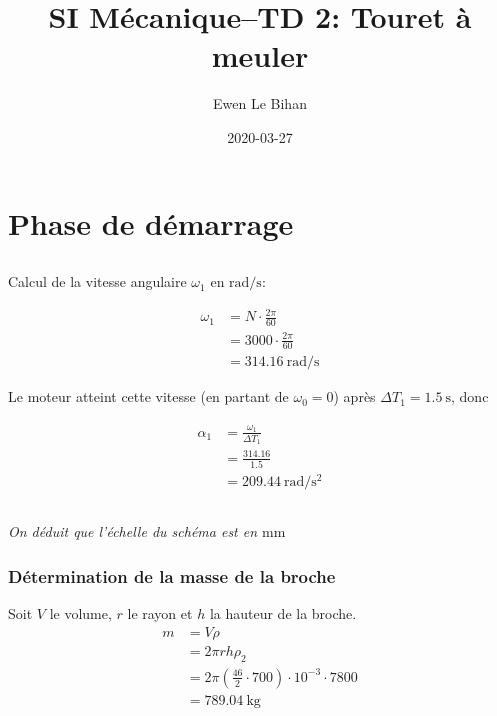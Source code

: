 \documentclass{article}
\title{SI Mécanique--TD 2: Touret à meuler}
\author{Ewen Le Bihan}
\date{2020-03-27}
\begin{document}
\maketitle

\section{Phase de démarrage}
\subsection{}

Calcul de la vitesse angulaire $\omega_1$ en $\si{\radian\per\second}$:

\begin{equation*}
  \begin{split}
    \omega_1 &= N \cdot \frac{2\pi}{60}\\
           &= 3000 \cdot \frac{2\pi}{60} \\
           &= \SI{314.16}{\radian\per\second}
  \end{split}
\end{equation*}

Le moteur atteint cette vitesse (en partant de $\omega_0 = 0$) après $\Delta T_1 = \SI{1.5}{\second}$, donc

\begin{equation*}
  \begin{split}
    \alpha_1 &= \frac{\omega_1}{\Delta T_1}\\
             &= \frac{314.16}{1.5} \\
             &= \SI{209.44}{\radian\per\second\squared}
  \end{split}
\end{equation*}

\subsection{}
\emph{On déduit que l'échelle du schéma est en $\si{\milli\meter}$}

\subsubsection{Détermination de la masse de la broche}

Soit $V$ le volume, $r$ le rayon et $h$ la hauteur de la broche.
\begin{equation*}
  \begin{split}
    m &= V\rho \\
      &= 2\pi r h \rho_2 \\
      &= 2\pi (\frac{46}{2} \cdot 700)\cdot10^{-3} \cdot 7800 \\
      &= \SI{789.04}{\kilo\gram}
  \end{split}
\end{equation*}
\end{document}

